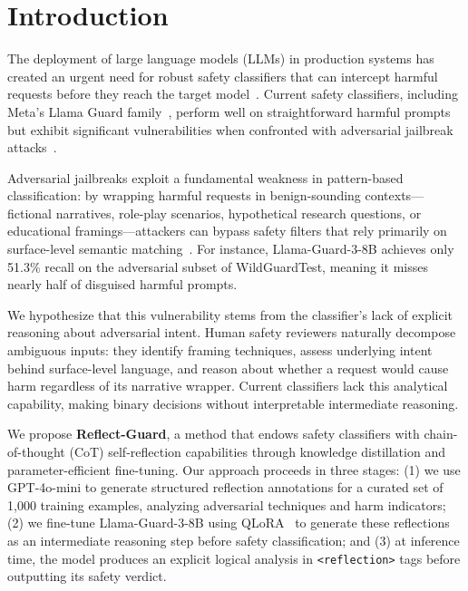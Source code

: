 \documentclass[Superintelligence,article,submit,pdftex,moreauthors]{Definitions/mdpi}
\begin{document}

\section{Introduction}

The deployment of large language models (LLMs) in production systems has created an urgent need for robust safety classifiers that can intercept harmful requests before they reach the target model~\citep{inan2023llamaguard, han2024wildguard}. Current safety classifiers, including Meta's Llama Guard family~\citep{inan2023llamaguard, metallamaguard3}, perform well on straightforward harmful prompts but exhibit significant vulnerabilities when confronted with adversarial jailbreak attacks~\citep{chao2023jailbreaking, zou2023universal, liu2024autodan}.

Adversarial jailbreaks exploit a fundamental weakness in pattern-based classification: by wrapping harmful requests in benign-sounding contexts---fictional narratives, role-play scenarios, hypothetical research questions, or educational framings---attackers can bypass safety filters that rely primarily on surface-level semantic matching~\citep{wei2024jailbroken}. For instance, Llama-Guard-3-8B achieves only 51.3\% recall on the adversarial subset of WildGuardTest, meaning it misses nearly half of disguised harmful prompts.

We hypothesize that this vulnerability stems from the classifier's lack of explicit reasoning about adversarial intent. Human safety reviewers naturally decompose ambiguous inputs: they identify framing techniques, assess underlying intent behind surface-level language, and reason about whether a request would cause harm regardless of its narrative wrapper. Current classifiers lack this analytical capability, making binary decisions without interpretable intermediate reasoning.

We propose \textbf{Reflect-Guard}, a method that endows safety classifiers with chain-of-thought (CoT) self-reflection capabilities through knowledge distillation and parameter-efficient fine-tuning. Our approach proceeds in three stages: (1) we use GPT-4o-mini to generate structured reflection annotations for a curated set of 1{,}000 training examples, analyzing adversarial techniques and harm indicators; (2) we fine-tune Llama-Guard-3-8B using QLoRA~\citep{dettmers2024qlora} to generate these reflections as an intermediate reasoning step before safety classification; and (3) at inference time, the model produces an explicit logical analysis in \texttt{<reflection>} tags before outputting its safety verdict.
\end{document}
